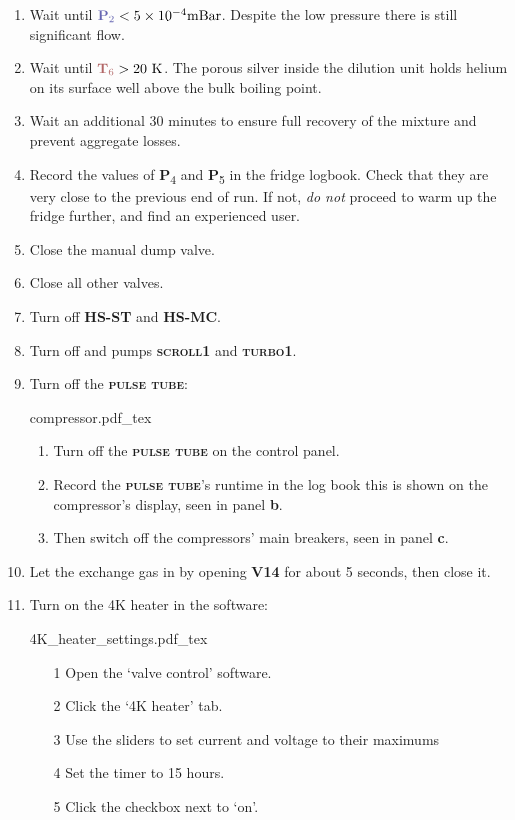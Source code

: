 \documentclass{article}[18pt,A4]
\newcommand{\mBar}{\mathrm{mBar}}
\newcommand{\kelvin}{\mathrm{K}}
\newcommand{\thing}[1]{{\color{gray}\textsc{ \textbf{#1}}}}
\newcommand{\valve}[1]{{\color{gray}\textbf{V#1}}}
\newcommand{\pressure}[1]{{\color{pressurecolor}\textbf{P}\textsubscript{#1}}}
\newcommand{\temperature}[1]{{\color{temperaturecolor}\textbf{T}\textsubscript{#1}}}
\begin{document}
\begin{enumerate}
    \item Wait until $\pressure{2} < 5\times10^{-4} \mBar$. Despite the low pressure there is still significant flow. 
    \item Wait until $\temperature{6} > 20~\kelvin$. The porous silver inside the dilution unit holds helium on its surface well above the bulk boiling point. 
    \item Wait an additional 30 minutes to ensure full recovery of the mixture and prevent aggregate losses. 
    \item Record the values of \pressure{4} and \pressure{5} in the fridge logbook.
    Check that they are very close to the previous end of run. 
    If not, \emph{do not} proceed to warm up the fridge further, and find an experienced user.
    \item Close the manual dump valve.
    \item Close all other valves.
    \item Turn off \thing{HS-ST} and \thing{HS-MC}.
    \item Turn off and pumps \thing{scroll1} and \thing{turbo1}. 
    
    \item Turn off the \thing{pulse tube}:
    
    {
    \centering
    {compressor.pdf_tex}
    }
    \begin{enumerate}
    \item Turn off the \thing{pulse tube} on the control panel.
    \item Record the \thing{pulse tube}'s runtime in the log book this is shown on the compressor's display, seen in panel \textbf{b}.
    \item Then switch off the compressors' main breakers, seen in panel \textbf{c}.
    \end{enumerate}
    
    \item Let the exchange gas in by opening \valve{14} for about 5 seconds, then close it. 
    \item Turn on the 4K heater in the software:
    
    {
    \centering
    {4K_heater_settings.pdf_tex}
    }
        \begin{enumerate}
        \item[1] Open the `valve control' software.
        \item[2] Click the `4K heater' tab. 
        \item[3] Use the sliders to set current and voltage to their maximums
        \item[4] Set the timer to 15 hours.
        \item[5] Click the checkbox next to `on'.
        \end{enumerate}
        

\end{enumerate}
\end{document}
